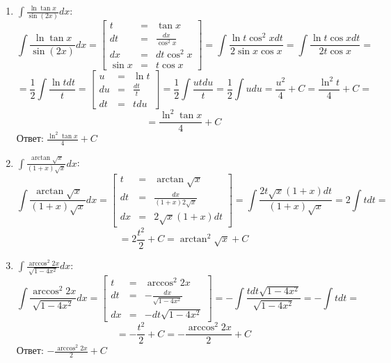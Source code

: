 \documentclass[a4paper,12pt]{article}
\begin{document}
\begin{enumerate}
    \item $\int\frac{\ln\tan x}{\sin(2x)}dx$:
    $$\int\frac{\ln\tan x}{\sin(2x)}dx = \left[\begin{array}{rcl}
        t & = & \tan x \\
        dt & = & \frac{dx}{\cos^2x} \\
        dx & = & dt\cos^2 x \\
        \sin x & = & t\cos x
    \end{array}\right] = \int\frac{\ln t\cos^2 xdt}{2\sin x\cos x} = \int \frac{\ln t\cos xdt}{2t\cos x} =$$
    $$= \frac{1}{2}\int\frac{\ln tdt}{t} = \left[\begin{array}{rcl}
        u & = & \ln t \\
        du & = & \frac{dt}{t} \\
        dt & = & tdu
    \end{array}\right] = \frac{1}{2}\int\frac{utdu}{t} = \frac{1}{2}\int udu = \frac{u^2}{4} + C = \frac{\ln^2t}{4} + C = $$
    $$= \frac{\ln^2\tan x}{4} + C$$
    Ответ: $\frac{\ln^2\tan x}{4}+ C$

    \item $\int\frac{\arctan\sqrt{x}}{(1 + x)\sqrt{x}}dx$:
    $$\int\frac{\arctan\sqrt{x}}{(1 + x)\sqrt{x}}dx = \left[\begin{array}{rcl}
        t & = & \arctan\sqrt{x} \\
        dt & = & \frac{dx}{(1 + x)2\sqrt{x}} \\
        dx & = & 2\sqrt{x}(1 + x)dt
    \end{array}\right] = \int\frac{2t\sqrt{x}(1+x)dt}{(1+x)\sqrt{x}} = 2\int tdt =$$
    $$= 2\frac{t^2}{2} + C = \arctan^2\sqrt{x} + C$$

    \item $\int\frac{\arccos^2 2x}{\sqrt{1 - 4x^2}}dx$:
    $$\int\frac{\arccos^2 2x}{\sqrt{1 - 4x^2}}dx = \left[\begin{array}{rcl}
        t & = & \arccos^2 2x \\
        dt & = & -\frac{dx}{\sqrt{1 - 4x^2}} \\
        dx & = & -dt\sqrt{1 - 4x^2}
    \end{array}\right] = -\int\frac{tdt\sqrt{1 - 4x^2}}{\sqrt{1 - 4x^2}} = -\int tdt =$$
    $$= -\frac{t^2}{2} + C = -\frac{\arccos^2 2x}{2} + C$$
    Ответ: $-\frac{\arccos^2 2x}{2} + C$


\end{enumerate}
\end{document}
